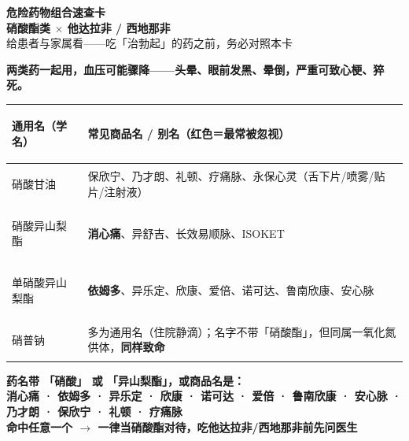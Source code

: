 \documentclass[a4paper,8.5pt]{ctexart}
\newcommand{\cardtitle}[1]{{\color{white}\bfseries\small #1}}
\begin{document}
\begin{center}
  {\color{myred}\large\bfseries 危险药物组合速查卡}\\[1pt]
  {\large\bfseries 硝酸酯类 \(\times\) 他达拉非 / 西地那非}\\[1pt]
  {\color{mygray}\small 给患者与家属看——吃「治勃起」的药之前，务必对照本卡}
\end{center}

\vspace{2mm}

\begin{card}[colback=myred, colframe=myred]
  {\color{white}\bfseries\large 两类药一起用，血压可能骤降——头晕、眼前发黑、晕倒，严重可致心梗、猝死。}
\end{card}

\begin{card}[colback=myblueL, colframe=myblue, title={\cardtitle{1\ \ 哪些药是「硝酸酯」（看商品名认全）}}]
{\small
\begin{tabularx}{\textwidth}{@{}>{\bfseries\raggedright\arraybackslash}p{3.1cm} X@{}}
\toprule
通用名（学名） & 常见商品名 / 别名（\textcolor{myred}{红色}＝最常被忽视） \\
\midrule
硝酸甘油 & 保欣宁、乃才朗、礼顿、疗痛脉、永保心灵（舌下片/喷雾/贴片/注射液） \\
硝酸异山梨酯 & \textcolor{myred}{\bfseries 消心痛}、异舒吉、长效易顺脉、ISOKET \\
单硝酸异山梨酯 & \textcolor{myred}{\bfseries 依姆多}、异乐定、欣康、爱倍、诺可达、鲁南欣康、安心脉 \\
硝普钠 & 多为通用名（住院静滴）；名字不带「硝酸酯」，但同属一氧化氮供体，\textbf{同样致命} \\
\bottomrule
\end{tabularx}}
\end{card}

\begin{card}[colback=myredL, colframe=myred, title={\cardtitle{2\ \ 3 秒认全口诀}}]
{\bfseries\small
药名带 \textcolor{myred}{「硝酸」} 或 \textcolor{myred}{「异山梨酯」}，或商品名是：\\[1pt]
{\small 消心痛 · 依姆多 · 异乐定 · 欣康 · 诺可达 · 爱倍 · 鲁南欣康 · 安心脉 · 乃才朗 · 保欣宁 · 礼顿 · 疗痛脉}\\[1pt]
{\small 命中任意一个 $\to$ 一律当硝酸酯对待，\textbf{吃他达拉非/西地那非前先问医生}}
}
\end{card}
\end{document}
